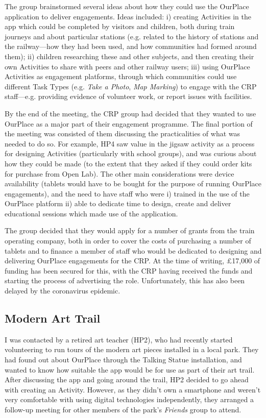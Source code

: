 The group brainstormed several ideas about how they could use the OurPlace application to deliver engagements. Ideas included: i) creating Activities in the app which could be completed by visitors and children, both during train journeys and about particular stations (e.g. related to the history of stations and the railway---how they had been used, and how communities had formed around them); ii) children researching these and other subjects, and then creating their own Activities to share with peers and other railway users; iii) using OurPlace Activities as engagement platforms, through which communities could use different Task Types (e.g. \textit{Take a Photo},\textit{ Map Marking}) to engage with the CRP staff---e.g. providing evidence of volunteer work, or report issues with facilities. 

By the end of the meeting, the CRP group had decided that they wanted to use OurPlace as a major part of their engagement programme. The final portion of the meeting was consisted of them discussing the practicalities of what was needed to do so. For example, HP4 saw value in the jigsaw activity as a process for designing Activities (particularly with school groups), and was curious about how they could be made (to the extent that they asked if they could order kits for purchase from Open Lab). The other main considerations were device availability (tablets would have to be bought for the purpose of running OurPlace engagements), and the need to have staff who were i) trained in the use of the OurPlace platform ii) able to dedicate time to design, create and deliver educational sessions which made use of the application.

The group decided that they would apply for a number of grants from the train operating company, both in order to cover the costs of purchasing a number of tablets and to finance a member of staff who would be dedicated to designing and delivering OurPlace engagements for the CRP. At the time of writing, £17,000 of funding has been secured for this, with the CRP having received the funds and starting the process of advertising the role. Unfortunately, this has also been delayed by the coronavirus epidemic.

\subsection{Modern Art Trail}
\label{app:ModernArtTrail}

I was contacted by a retired art teacher (HP2), who had recently started volunteering to run tours of the modern art pieces installed in a local park. They had found out about OurPlace through the Talking Statue installation, and wanted to know how suitable the app would be for use as part of their art trail. After discussing the app and going around the trail, HP2 decided to go ahead with creating an Activity. However, as they didn't own a smartphone and weren't very comfortable with using digital technologies independently, they arranged a follow-up meeting for other members of the park's \textit{Friends} group to attend.

